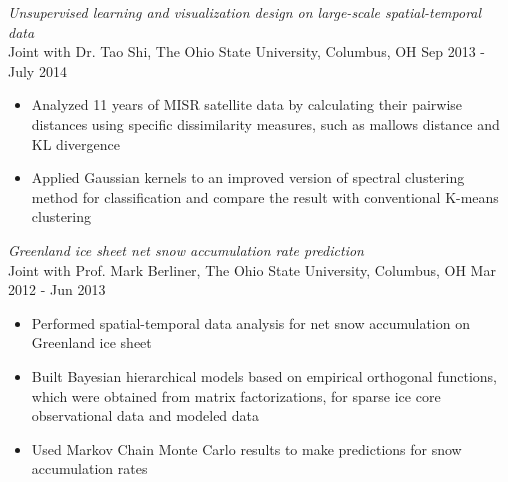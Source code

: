 \documentclass[10pt]{res} %
\begin{document}
\begin{resume}
  {\sl Unsupervised learning and visualization design on
     large-scale spatial-temporal data}\\
Joint with Dr. Tao Shi, The Ohio State University, Columbus, OH
\hfill Sep 2013 - July 2014
 \begin{itemize} \itemsep -2pt  %
\item Analyzed 11 years of MISR satellite data by calculating their pairwise distances using specific dissimilarity
 measures, such as mallows distance and KL divergence
\item Applied Gaussian kernels to an improved version of spectral
  clustering method for classification and compare the result with conventional K-means clustering
\end{itemize}

  {\sl Greenland ice sheet net snow accumulation rate prediction}\\
Joint with Prof. Mark Berliner, The Ohio State University, Columbus, OH \hfill Mar 2012 - Jun 2013
 \begin{itemize} \itemsep -2pt  %
    \item Performed spatial-temporal data analysis for net snow
      accumulation on Greenland ice sheet
    \item Built Bayesian hierarchical models based on empirical
      orthogonal functions, which were obtained from matrix
      factorizations, for sparse ice core observational data and modeled data
    \item Used Markov Chain Monte Carlo results to make predictions for snow accumulation rates 
\end{itemize}


















\end{resume}
\end{document}
